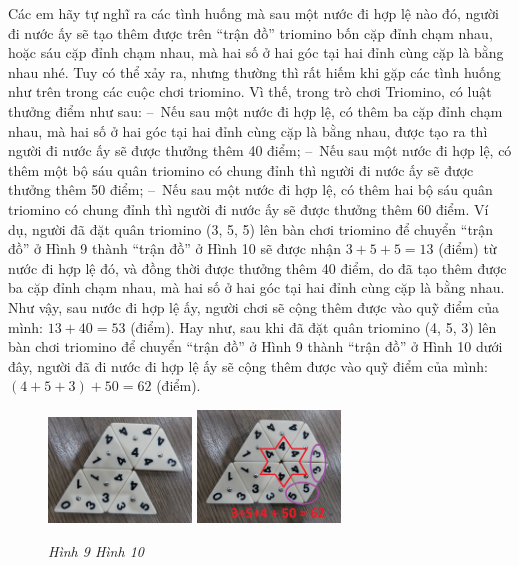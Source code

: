 	Các em hãy tự nghĩ ra các tình huống mà sau một nước đi hợp lệ nào đó, người đi nước ấy sẽ tạo thêm được trên “trận đồ” triomino bốn cặp đỉnh chạm nhau, hoặc sáu cặp đỉnh chạm nhau, mà hai số ở hai góc tại hai đỉnh cùng cặp là bằng nhau nhé.
	\vskip 0.1cm
	Tuy có thể xảy ra, nhưng thường thì rất hiếm khi gặp các tình huống như trên trong các cuộc chơi triomino. Vì thế, trong trò chơi Triomino, có luật thưởng điểm như sau:
	\vskip 0.1cm
	--\ Nếu sau một nước đi hợp lệ, có thêm ba cặp đỉnh chạm nhau, mà hai số ở hai góc tại hai đỉnh cùng cặp là bằng nhau, được tạo ra thì người đi nước ấy sẽ được thưởng thêm 40 điểm;
	\vskip 0.1cm
	--\ Nếu sau một nước đi hợp lệ, có thêm một bộ sáu quân triomino có chung đỉnh thì người đi nước ấy sẽ được thưởng thêm 50 điểm;
	\vskip 0.1cm
	--\ Nếu sau một nước đi hợp lệ, có thêm hai bộ sáu quân triomino có chung đỉnh thì người đi nước ấy sẽ được thưởng thêm 60 điểm.
	\vskip 0.1cm
	Ví dụ, người đã đặt quân triomino (3, 5, 5) lên bàn chơi triomino để chuyển “trận đồ” ở Hình 9 thành “trận đồ” ở Hình 10 sẽ được nhận
	\vskip 0.1cm
	\hspace*{100pt}$3+5+5=13$ (điểm)
	\vskip 0.1cm
	từ nước đi hợp lệ đó, và đồng thời được thưởng thêm 40 điểm, do đã tạo thêm được ba cặp đỉnh chạm nhau, mà hai số ở hai góc tại hai đỉnh cùng cặp là bằng nhau. Như vậy, sau nước đi hợp lệ ấy, người chơi sẽ cộng thêm được vào quỹ điểm của mình:
	\vskip 0.1cm
	\hspace*{100pt} $13+40=53$ (điểm).
	\vskip 0.1cm
	Hay như, sau khi đã đặt quân triomino (4, 5, 3) lên bàn chơi triomino để chuyển “trận đồ” ở Hình 9 thành “trận đồ” ở Hình 10 dưới đây, người đã đi nước đi hợp lệ ấy sẽ cộng thêm được vào quỹ điểm của mình:
	\vskip 0.1cm
	\hspace*{80pt} $(4+5+3)+50 =62$ (điểm).
	\begin{figure}[H]
		\centering
		\captionsetup{labelformat=empty, justification=centering}
		\includegraphics[width=0.34\textwidth]{h9a}
		\includegraphics[width=0.34\textwidth]{h10a}
			\caption{\textit{\small Hình 9 \hspace*{75pt} Hình 10}}
	\end{figure}
